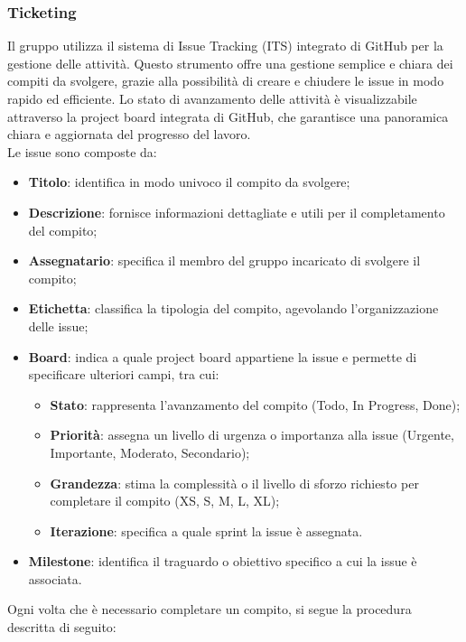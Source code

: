 \documentclass[10pt]{article}
\begin{document}
\begin{justify}
    \subsubsection{Ticketing}
    Il gruppo utilizza il sistema di Issue Tracking (ITS) integrato di GitHub per la gestione delle attività. Questo strumento offre una gestione semplice e chiara dei compiti da svolgere, grazie alla possibilità di creare e chiudere le issue in modo rapido ed efficiente. Lo stato di avanzamento delle attività è visualizzabile attraverso la project board integrata di GitHub, che garantisce una panoramica chiara e aggiornata del progresso del lavoro.\\
    Le issue sono composte da:
    \begin{itemize}
        \item \textbf{Titolo}: identifica in modo univoco il compito da svolgere;
        \item \textbf{Descrizione}: fornisce informazioni dettagliate e utili per il completamento del compito;
        \item \textbf{Assegnatario}: specifica il membro del gruppo incaricato di svolgere il compito;
        \item \textbf{Etichetta}: classifica la tipologia del compito, agevolando l'organizzazione delle issue;
        \item \textbf{Board}: indica a quale project board appartiene la issue e permette di specificare ulteriori campi, tra cui:
        \begin{itemize}
            \item \textbf{Stato}: rappresenta l'avanzamento del compito (Todo, In Progress, Done);
            \item \textbf{Priorità}: assegna un livello di urgenza o importanza alla issue (Urgente, Importante, Moderato, Secondario);
            \item \textbf{Grandezza}: stima la complessità o il livello di sforzo richiesto per completare il compito (XS, S, M, L, XL);
            \item \textbf{Iterazione}: specifica a quale sprint la issue è assegnata.
        \end{itemize}
        \item \textbf{Milestone}: identifica il traguardo o obiettivo specifico a cui la issue è associata.
    \end{itemize}
    Ogni volta che è necessario completare un compito, si segue la procedura descritta di seguito:
    \begin{enumerate}

\end{enumerate}
\end{justify}
\end{document}
